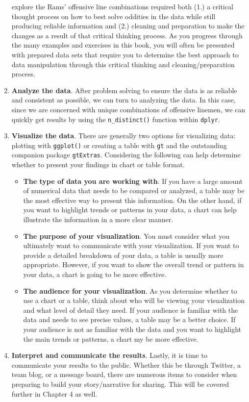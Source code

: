 \documentclass[
  letterpaper,
]{krantz}
\begin{document}
\begin{enumerate}
  explore the Rams' offensive line combinations required both (1.) a
  critical thought process on how to best solve oddities in the data
  while still producing reliable information and (2.) cleaning and
  preparation to make the changes as a result of that critical thinking
  process. As you progress through the many examples and exercises in
  this book, you will often be presented with prepared data sets that
  require you to determine the best approach to data manipulation
  through this critical thinking and cleaning/preparation process.
\item
  \textbf{Analyze the data}. After problem solving to ensure the data is
  as reliable and consistent as possible, we can turn to analyzing the
  data. In this case, since we are concerned with unique combinations of
  offensive linemen, we can quickly get results by using the
  \texttt{n\_distinct()} function within \texttt{dplyr}.
\item
  \textbf{Visualize the data}. There are generally two options for
  visualizing data: plotting with \texttt{ggplot()} or creating a table
  with \texttt{gt} and the outstanding companion package
  \texttt{gtExtras}. Considering the following can help determine
  whether to present your findings in chart or table format.

  \begin{itemize}
  \item
    \textbf{The type of data you are working with}. If you have a large
    amount of numerical data that needs to be compared or analyzed, a
    table may be the most effective way to present this information. On
    the other hand, if you want to highlight trends or patterns in your
    data, a chart can help illustrate the information in a more clear
    manner.
  \item
    \textbf{The purpose of your visualization}. You must consider what
    you ultimately want to communicate with your visualization. If you
    want to provide a detailed breakdown of your data, a table is
    usually more appropriate. However, if you want to show the overall
    trend or pattern in your data, a chart is going to be more
    effective.
  \item
    \textbf{The audience for your visualization}. As you determine
    whether to use a chart or a table, think about who will be viewing
    your visualization and what level of detail they need. If your
    audience is familiar with the data and needs to see precise values,
    a table may be a better choice. If your audience is not as familiar
    with the data and you want to highlight the main trends or patterns,
    a chart my be more effective.
  \end{itemize}
\item
  \textbf{Interpret and communicate the results}. Lastly, it is time to
  communicate your results to the public. Whether this be through
  Twitter, a team blog, or a message board, there are numerous items to
  consider when preparing to build your story/narrative for sharing.
  This will be covered further in Chapter 4 as well.
\end{enumerate}
\end{document}
